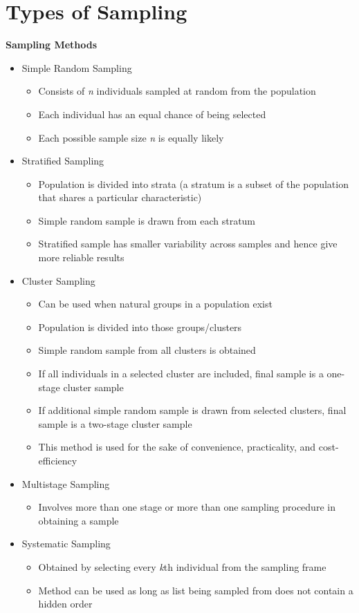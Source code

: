 \documentclass{article}
\begin{document}
\section{Types of Sampling}

\textbf{Sampling Methods}
\begin{itemize}
    \item Simple Random Sampling
    \begin{itemize}
        \item Consists of \emph{n} individuals sampled at random from the population
        \item Each individual has an equal chance of being selected
        \item Each possible sample size \emph{n} is equally likely
    \end{itemize}
    \item Stratified Sampling
    \begin{itemize}
        \item Population is divided into strata (a stratum is a subset of the population that shares a particular characteristic)
        \item Simple random sample is drawn from each stratum
        \item Stratified sample has smaller variability across samples and hence give more reliable results 
    \end{itemize}
    \item Cluster Sampling
    \begin{itemize}
        \item Can be used when natural groups in a population exist
        \item Population is divided into those groups/clusters
        \item Simple random sample from all clusters is obtained
        \item If all individuals in a selected cluster are included, final sample is a one-stage cluster sample
        \item If additional simple random sample is drawn from selected clusters, final sample is a two-stage cluster sample
        \item This method is used for the sake of convenience, practicality, and cost-efficiency
    \end{itemize}
    \item Multistage Sampling
    \begin{itemize}
        \item Involves more than one stage or more than one sampling procedure in obtaining a sample
    \end{itemize}
    \item Systematic Sampling
    \begin{itemize}
        \item Obtained by selecting every \emph{k}th individual from the sampling frame
        \item Method can be used as long as list being sampled from does not contain a hidden order
    \end{itemize}
\end{itemize}
\end{document}
